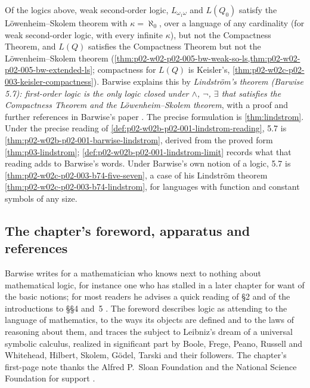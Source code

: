 Of the logics above, weak second-order logic, \(L_{\omega_1\omega}\) and
\(L(Q_0)\) satisfy the L\"owenheim--Skolem theorem with \(\kappa=\aleph_0\),
over a language of any cardinality (for weak second-order logic, with every
infinite \(\kappa\)), but not the Compactness Theorem, and \(L(Q)\) satisfies the Compactness
Theorem but not the L\"owenheim--Skolem theorem
(\cref{thm:p02-w02-p02-005-bw-weak-so-ls,thm:p02-w02-p02-005-bw-extended-ls};
compactness for \(L(Q)\) is Keisler's,
\cref{thm:p02-w02c-p02-003-keisler-compactness}).  Barwise explains this by
\emph{Lindstr\"om's theorem (Barwise 5.7): first-order logic is the only
logic closed under \(\land\), \(\neg\), \(\exists\) that satisfies the
Compactness Theorem and the L\"owenheim--Skolem theorem}, with a proof and
further references in Barwise's paper \cite{Barwise1974Axioms}
\cite[ch.~A.1, \S5, p.~45]{Barwise1977FirstOrder}.  The precise
formulation is \cref{thm:lindstrom}.  Under the precise reading of
\cref{def:p02-w02b-p02-001-lindstrom-reading}, 5.7 is
\cref{thm:p02-w02b-p02-001-barwise-lindstrom}, derived from the proved form
\cref{thm:p03-lindstrom}; \cref{def:p02-w02b-p02-001-lindstrom-limit}
records what that reading adds to Barwise's words.  Under Barwise's own
notion of a logic, 5.7 is \cref{thm:p02-w02c-p02-003-b74-five-seven}, a
case of his Lindstr\"om theorem \cref{thm:p02-w02c-p02-003-b74-lindstrom},
for languages with function and constant symbols of any size.

\subsection{The chapter's foreword, apparatus and references}
\label{sec:p02-w02-p02-005-bw-apparatus}

Barwise writes for a mathematician who knows next to nothing about
mathematical logic, for instance one who has stalled in a later chapter
for want of the basic notions; for most readers he advises a quick reading
of \S2 and of the introductions to \S\S4 and~5
\cite[ch.~A.1, \S1, p.~6]{Barwise1977FirstOrder}.  The foreword describes
logic as attending to the language of mathematics, to the ways its objects
are defined and to the laws of reasoning about them, and traces the
subject to Leibniz's dream of a universal symbolic calculus, realized in
significant part by Boole, Frege, Peano, Russell and Whitehead, Hilbert,
Skolem, G\"odel, Tarski and their followers.  The chapter's first-page
note thanks the Alfred P.~Sloan Foundation and the National Science
Foundation for support \cite[ch.~A.1, p.~5]{Barwise1977FirstOrder}.

